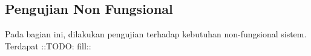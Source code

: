 \subsection{Pengujian Non Fungsional}
Pada bagian ini, dilakukan pengujian terhadap kebutuhan non-fungsional sistem. Terdapat ::TODO: fill::